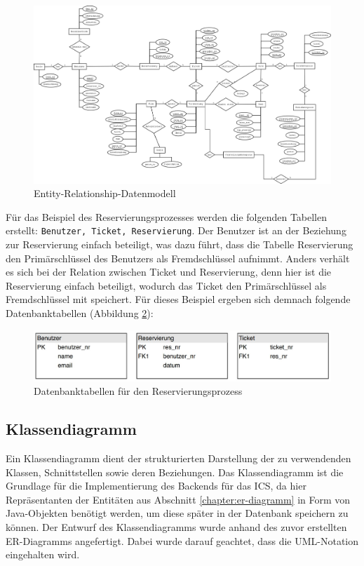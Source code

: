 					\begin{figure}[H]
						\centering 
						\includegraphics[angle=+90,width=13cm]{img/erModell.png}
						\captionsetup{format=hang}
						\caption[ER-Datenmodell]{\label{fig:erModell} Entity-Relationship-Datenmodell}
					\end{figure}
				
		
		Für das Beispiel des Reservierungsprozesses werden die folgenden Tabellen erstellt: \texttt{Benutzer, Ticket, Reservierung}. Der Benutzer ist an der Beziehung zur Reservierung einfach beteiligt, was dazu führt, dass die Tabelle Reservierung den Primärschlüssel des Benutzers als Fremdschlüssel aufnimmt. Anders verhält es sich bei der Relation zwischen Ticket und Reservierung, denn hier ist die Reservierung einfach beteiligt, wodurch das Ticket den Primärschlüssel als Fremdschlüssel mit speichert. Für dieses Beispiel ergeben sich demnach folgende Datenbanktabellen (Abbildung \ref{fig:database_example}):
		 
		\begin{figure}[H]
			\centering 
			\includegraphics[width=15cm]{img/database_example.JPG}
			\captionsetup{format=hang}
			\caption[Datenbanktabellen Reservierungsprozess]{\label{fig:database_example}Datenbanktabellen für den Reservierungsprozess}
		\end{figure}
		
		\subsection{Klassendiagramm}
		Ein Klassendiagramm dient der strukturierten Darstellung der zu verwendenden Klassen, Schnittstellen sowie deren Beziehungen. Das Klassendiagramm ist die Grundlage für die Implementierung des Backends für das \ac{ICS}, da hier Repräsentanten der Entitäten aus Abschnitt \ref{chapter:er-diagramm} in Form von Java-Objekten benötigt werden, um diese später in der Datenbank speichern zu können. Der Entwurf des Klassendiagramms wurde anhand des zuvor erstellten ER-Diagramms angefertigt. Dabei wurde darauf geachtet, dass die UML-Notation eingehalten wird.
		
